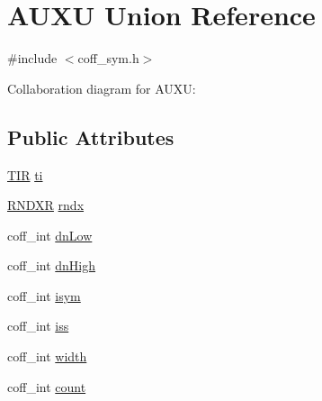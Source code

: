 \hypertarget{unionAUXU}{
\section{AUXU Union Reference}
\label{unionAUXU}
}


{\ttfamily \#include $<$coff\_\-sym.h$>$}



Collaboration diagram for AUXU:
\subsection*{Public Attributes}
\begin{DoxyCompactItemize}
\item 
\hyperlink{structTIR}{TIR} \hyperlink{unionAUXU_aeed8d219ef07fd07c30c04690e566191}{ti}
\item 
\hyperlink{structRNDXR}{RNDXR} \hyperlink{unionAUXU_a94430b9767d7cdd6319772ede408e526}{rndx}
\item 
coff\_\-int \hyperlink{unionAUXU_a4ad1de46371c0a052485d93d44b9dd8c}{dnLow}
\item 
coff\_\-int \hyperlink{unionAUXU_a7ebafc817c7ce05883534f32ccc89b28}{dnHigh}
\item 
coff\_\-int \hyperlink{unionAUXU_a83e9abf908e181a2af122dfa0a880341}{isym}
\item 
coff\_\-int \hyperlink{unionAUXU_abf7ab39f3d114bfe343d6187238e97a4}{iss}
\item 
coff\_\-int \hyperlink{unionAUXU_a9c1651961315a871bd30484de8df7818}{width}
\item 
coff\_\-int \hyperlink{unionAUXU_a65a4ab944edcf38e8652f909331762ba}{count}
\end{DoxyCompactItemize}


